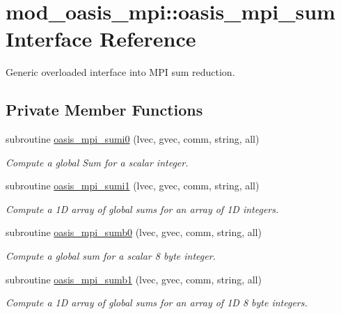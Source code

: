 \hypertarget{interfacemod__oasis__mpi_1_1oasis__mpi__sum}{}\section{mod\+\_\+oasis\+\_\+mpi\+:\+:oasis\+\_\+mpi\+\_\+sum Interface Reference}
\label{interfacemod__oasis__mpi_1_1oasis__mpi__sum}


Generic overloaded interface into M\+PI sum reduction.  


\subsection*{Private Member Functions}
\begin{DoxyCompactItemize}
\item 
subroutine \hyperlink{interfacemod__oasis__mpi_1_1oasis__mpi__sum_ace0332192a77ef918fa53fa5087386cc}{oasis\+\_\+mpi\+\_\+sumi0} (lvec, gvec, comm, string, all)
\begin{DoxyCompactList}\small\item\em Compute a global Sum for a scalar integer. \end{DoxyCompactList}\item 
subroutine \hyperlink{interfacemod__oasis__mpi_1_1oasis__mpi__sum_a98942ad26b72d6ff96fd8631ec70a5ce}{oasis\+\_\+mpi\+\_\+sumi1} (lvec, gvec, comm, string, all)
\begin{DoxyCompactList}\small\item\em Compute a 1D array of global sums for an array of 1D integers. \end{DoxyCompactList}\item 
subroutine \hyperlink{interfacemod__oasis__mpi_1_1oasis__mpi__sum_a8d3b0d2544f1f360d83076b3d6dfe9e9}{oasis\+\_\+mpi\+\_\+sumb0} (lvec, gvec, comm, string, all)
\begin{DoxyCompactList}\small\item\em Compute a global sum for a scalar 8 byte integer. \end{DoxyCompactList}\item 
subroutine \hyperlink{interfacemod__oasis__mpi_1_1oasis__mpi__sum_af53d904fe38089eb567660f0d4f89fb0}{oasis\+\_\+mpi\+\_\+sumb1} (lvec, gvec, comm, string, all)
\begin{DoxyCompactList}\small\item\em Compute a 1D array of global sums for an array of 1D 8 byte integers. \end{DoxyCompactList}\item 

\end{DoxyCompactItemize}

